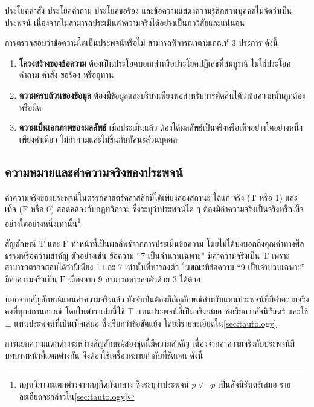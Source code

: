 ประโยคคำสั่ง ประโยคคำถาม ประโยคขอร้อง และข้อความแสดงความรู้สึกส่วนบุคคลไม่จัดว่าเป็นประพจน์ เนื่องจากไม่สามารถประเมินค่าความจริงได้อย่างเป็นภววิสัยและแน่นอน

การตรวจสอบว่าข้อความใดเป็นประพจน์หรือไม่ สามารถพิจารณาตามเกณฑ์ 3 ประการ ดังนี้

\begin{enumerate}
    \item \textbf{โครงสร้างของข้อความ} ต้องเป็นประโยคบอกเล่าหรือประโยคปฏิเสธที่สมบูรณ์ ไม่ใช่ประโยคคำถาม คำสั่ง ขอร้อง หรืออุทาน
    
    \item \textbf{ความครบถ้วนของข้อมูล} ต้องมีข้อมูลและบริบทเพียงพอสำหรับการตัดสินได้ว่าข้อความนั้นถูกต้องหรือผิด
    
    \item \textbf{ความเป็นเอกภาพของผลลัพธ์} เมื่อประเมินแล้ว ต้องได้ผลลัพธ์เป็นจริงหรือเท็จอย่างใดอย่างหนึ่งเพียงค่าเดียว ไม่กำกวมและไม่ขึ้นกับทัศนะส่วนบุคคล
\end{enumerate}

\subsection{ความหมายและค่าความจริงของประพจน์}

ค่าความจริงของประพจน์ในตรรกศาสตร์คลาสสิกมีได้เพียงสองสถานะ ได้แก่ จริง ($\text{T}$ หรือ $1$) และ เท็จ ($\text{F}$ หรือ $0$) สอดคล้องกับกฎทวิภาวะ ซึ่งระบุว่าประพจน์ใด ๆ ต้องมีค่าความจริงเป็นจริงหรือเท็จอย่างใดอย่างหนึ่งเท่านั้น\footnote{กฎทวิภาวะแตกต่างจากกฎกีดกันกลาง ซึ่งระบุว่าประพจน์ $p \lor \neg p$ เป็นสัจนิรันดร์เสมอ รายละเอียดจะกล่าวใน\autoref{sec:tautology}}~\parencite{copi2014logic}

สัญลักษณ์ $\text{T}$ และ $\text{F}$ ทำหน้าที่เป็นผลลัพธ์จากการประเมินข้อความ โดยไม่ได้บ่งบอกถึงคุณค่าทางศีลธรรมหรือความสำคัญ ตัวอย่างเช่น ข้อความ ``7 เป็นจำนวนเฉพาะ'' มีค่าความจริงเป็น $\text{T}$ เพราะสามารถตรวจสอบได้ว่ามีเพียง 1 และ 7 เท่านั้นที่หารลงตัว ในขณะที่ข้อความ ``9 เป็นจำนวนเฉพาะ'' มีค่าความจริงเป็น $\text{F}$ เนื่องจาก 9 สามารถหารลงตัวด้วย 3 ได้ด้วย

นอกจากสัญลักษณ์แทนค่าความจริงแล้ว ยังจำเป็นต้องมีสัญลักษณ์สำหรับแทนประพจน์ที่มีค่าความจริงคงที่ทุกสถานการณ์ โดยในตำราเล่มนี้ใช้ $\top$ แทนประพจน์ที่เป็นจริงเสมอ ซึ่งเรียกว่าสัจนิรันดร์ และใช้ $\bot$ แทนประพจน์ที่เป็นเท็จเสมอ ซึ่งเรียกว่าข้อขัดแย้ง โดยมีรายละเอียดใน\autoref{sec:tautology}

การแยกความแตกต่างระหว่างสัญลักษณ์สองชุดนี้มีความสำคัญ เนื่องจากค่าความจริงกับประพจน์มีบทบาทหน้าที่แตกต่างกัน จึงต้องใช้เครื่องหมายกำกับที่ชัดเจน ดังนี้

